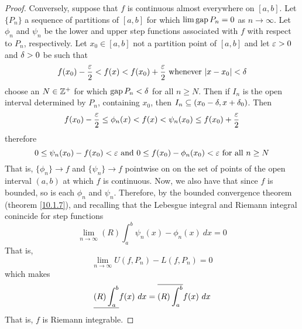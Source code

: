 \begin{proof}
    Conversely, suppose that $f$ is continuous almost everywhere on $[a,b]$. Let
    $\{P_n\}$ a sequence of partitions of $[a,b]$ for which $\lim{\operatorname{gap}{P_n}}=0$
    as $n \xrightarrow{} \infty$. Let $\phi_n$ and $\psi_n$ be the lower and
    upper step functions associated with  $f$ with respect to $P_n$,
    respectively. Let $x_0 \in [a,b]$ not a partition point of $[a,b]$ and let
    $\varepsilon>0$ and  $\delta>0$ be such that
    \begin{equation*}
        f(x_0)-\frac{\varepsilon}{2}<f(x)<f(x_0)+\frac{\varepsilon}{2} \text{ whenever }
        |x-x_0|<\delta
    \end{equation*}
    choose an $N \in \mathbb{Z}^+$ for which  $\operatorname{gap}{P_n}<\delta$ for all $n \geq N$. Then if
     $I_n$ is the open interval determined by  $P_n$, containing  $x_0$, then
     $I_n \subseteq (x_0-\delta,x+\delta_0)$. Then
     \begin{equation*}
        f(x_0)-\frac{\varepsilon}{2} \leq \phi_n(x)<f(x)<\psi_n(x_0) \leq f(x_0)+\frac{\varepsilon}{2}
     \end{equation*}
     therefore
     \begin{equation*}
         0 \leq \psi_n(x_0)-f(x_0)<\varepsilon \text{ and }
         0 \leq f(x_0)-\phi_n(x_0)<\varepsilon \text{ for all } n \geq N
     \end{equation*}
     That is, $\{\phi_n\} \xrightarrow{} f$ and $\{\psi_n\} \xrightarrow{} f$
     pointwise on on the set of points of the open interval $(a,b)$ at which $f$
     is continuous. Now, we also have that since  $f$ is bounded, so is each
     $\phi_n$ and $\psi_n$. Therefore, by the bounded convergence theorem
     (theorem \ref{10.1.7}), and recalling that the Lebesgue integral and
     Riemann integral conincide for step functions
     \begin{equation*}
         \lim_{n \xrightarrow{} \infty}{(R)\int_a^b{\psi_n(x)-\phi_n(x) \ dx}}=0
     \end{equation*}
     That is,
     \begin{equation*}
         \lim_{n \xrightarrow{} \infty}{U(f,P_n)-L(f,P_n)}=0
     \end{equation*}
     which makes
     \begin{equation*}
         \bbar{(R)\int_a^b}{f(x) \ dx}=\bar{(R)\int_a^b}{f(x) \ dx}
     \end{equation*}
     That is, $f$ is Riemann integrable.
\end{proof}
